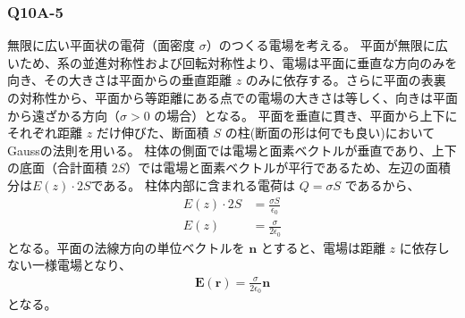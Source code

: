 \documentclass[platex,dvipdfmx,a4paper]{jsarticle}
\newcommand{\vect}[1]{\boldsymbol{#1}}
\begin{document}
  \subsubsection*{Q10A-5}
  無限に広い平面状の電荷（面密度 $\sigma$）のつくる電場を考える。
  平面が無限に広いため、系の並進対称性および回転対称性より、電場は平面に垂直な方向のみを向き、その大きさは平面からの垂直距離 $z$ のみに依存する。さらに平面の表裏の対称性から、平面から等距離にある点での電場の大きさは等しく、向きは平面から遠ざかる方向（$\sigma > 0$ の場合）となる。
  平面を垂直に貫き、平面から上下にそれぞれ距離 $z$ だけ伸びた、断面積 $S$ の柱(断面の形は何でも良い)においてGaussの法則を用いる。
  柱体の側面では電場と面素ベクトルが垂直であり、上下の底面（合計面積 $2S$）では電場と面素ベクトルが平行であるため、左辺の面積分は$E(z)\cdot 2S$である。
  柱体内部に含まれる電荷は $Q = \sigma S$ であるから、
  \begin{align*}
    E(z) \cdot 2S &= \frac{\sigma S}{\epsilon_0} \\
    E(z) &= \frac{\sigma}{2\epsilon_0}
  \end{align*}
  となる。平面の法線方向の単位ベクトルを $\vect{n}$ とすると、電場は距離 $z$ に依存しない一様電場となり、
  \begin{align*}
    \vect{E}(\vect{r}) = \frac{\sigma}{2\epsilon_0} \vect{n}
  \end{align*}
  となる。
 
\end{document}
